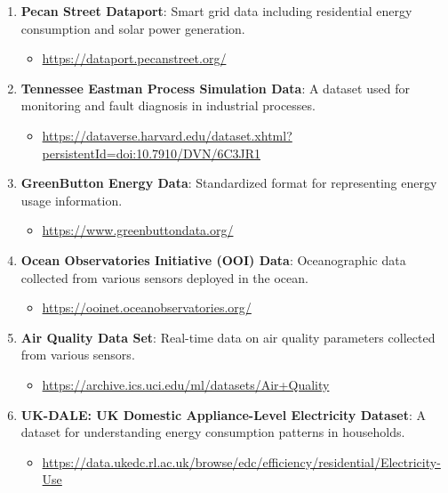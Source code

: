 \documentclass{article}
\begin{document}
\begin{enumerate}
    \item \textbf{Pecan Street Dataport}: Smart grid data including residential energy consumption and solar power generation.
    \begin{itemize}
        \item \url{https://dataport.pecanstreet.org/}
    \end{itemize}

    \item \textbf{Tennessee Eastman Process Simulation Data}: A dataset used for monitoring and fault diagnosis in industrial processes.
    \begin{itemize}
        \item \url{https://dataverse.harvard.edu/dataset.xhtml?persistentId=doi:10.7910/DVN/6C3JR1}
    \end{itemize}

    \item \textbf{GreenButton Energy Data}: Standardized format for representing energy usage information.
    \begin{itemize}
        \item \url{https://www.greenbuttondata.org/}
    \end{itemize}

    \item \textbf{Ocean Observatories Initiative (OOI) Data}: Oceanographic data collected from various sensors deployed in the ocean.
    \begin{itemize}
        \item \url{https://ooinet.oceanobservatories.org/}
    \end{itemize}

    \item \textbf{Air Quality Data Set}: Real-time data on air quality parameters collected from various sensors.
    \begin{itemize}
        \item \url{https://archive.ics.uci.edu/ml/datasets/Air+Quality}
    \end{itemize}

    \item \textbf{UK-DALE: UK Domestic Appliance-Level Electricity Dataset}: A dataset for understanding energy consumption patterns in households.
    \begin{itemize}
        \item \url{https://data.ukedc.rl.ac.uk/browse/edc/efficiency/residential/Electricity-Use}
    \end{itemize}


\end{enumerate}
\end{document}
